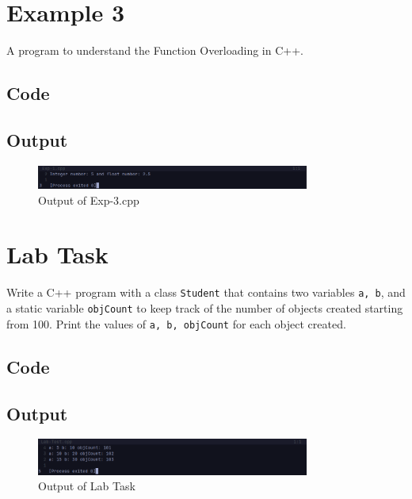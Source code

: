 \documentclass[12pt]{article}
\begin{document}
\FloatBarrier
\section*{Example 3}
A program to understand the Function Overloading in C++.

\subsection*{Code}


\subsection*{Output}
\begin{figure}[htpb]
    \centering
    \includegraphics[width=0.8\textwidth]{Exp-3.png}
    \caption{Output of Exp-3.cpp}
\end{figure}


\FloatBarrier
\section*{Lab Task}
Write a C++ program with a class \texttt{Student} that contains two variables \texttt{a, b}, and a static variable \texttt{objCount} to keep track of the number of objects created starting from 100. Print the values of \texttt{a, b, objCount} for each object created.

\subsection*{Code}


\subsection*{Output}
\begin{figure}[htpb]
    \centering
    \includegraphics[width=0.8\textwidth]{Lab-Test.png}
    \caption{Output of Lab Task}
\end{figure}


\FloatBarrier
\end{document}

